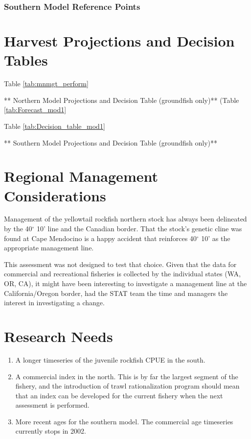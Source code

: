 \documentclass[12pt,]{article}
\begin{document}
\subsubsection{Southern Model Reference
Points}\label{southern-model-reference-points}

\newpage

\section{Harvest Projections and Decision
Tables}\label{harvest-projections-and-decision-tables}

Table \ref{tab:mnmgt_perform}

** Northern Model Projections and Decision Table (groundfish only)**
(Table \ref{tab:Forecast_mod1}

Table \ref{tab:Decision_table_mod1}

** Southern Model Projections and Decision Table (groundfish only)**

\newpage

\section{Regional Management
Considerations}\label{regional-management-considerations}

Management of the yellowtail rockfish northern stock has always been
delineated by the 40\(^\circ\) 10' line and the Canadian border. That
the stock's genetic cline was found at Cape Mendocino is a happy
accident that reinforces 40\(^\circ\) 10' as the appropriate management
line.

This assessment was not designed to test that choice. Given that the
data for commercial and recreational fisheries is collected by the
individual states (WA, OR, CA), it might have been interesting to
investigate a management line at the California/Oregon border, had the
STAT team the time and managers the interest in investigating a change.

\newpage

\section{Research Needs}\label{research-needs}

\begin{enumerate}

\item A longer timeseries of the juvenile rockfish CPUE in the south.

\item A commercial index in the north.  This is by far the largest segment of the fishery, and the introduction of trawl rationalization program should mean that an index can be developed for the current fishery when the next assessment is performed.

\item More recent ages for the southern model.  The commercial age timeseries currently stops in 2002.

\end{enumerate}
\end{document}
